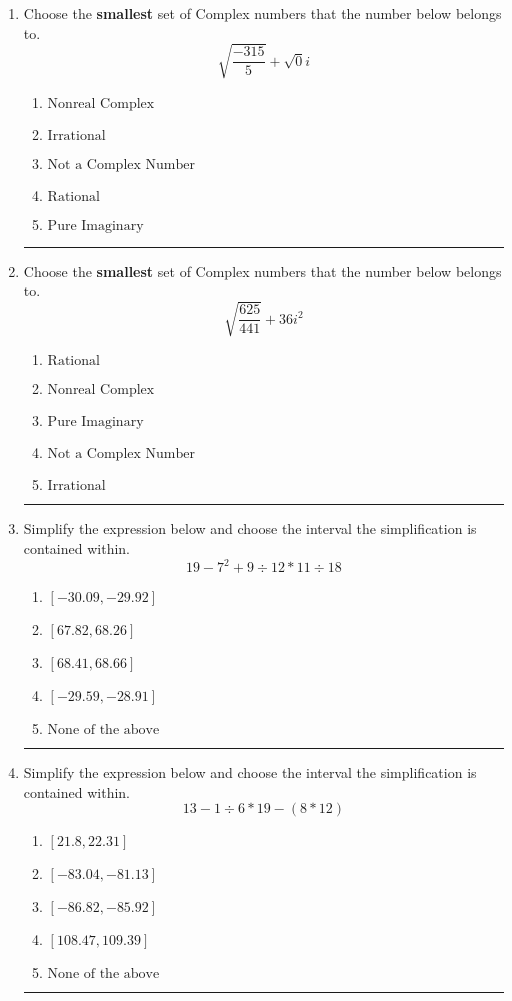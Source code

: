 \documentclass[14pt]{extbook}
\newcommand{\litem}[1]{\item#1\hspace*{-1cm}\rule{\textwidth}{0.4pt}}
\begin{document}
\begin{enumerate}
\litem{
Choose the \textbf{smallest} set of Complex numbers that the number below belongs to.\[ \sqrt{\frac{-315}{5}}+\sqrt{0}i \]\begin{enumerate}[label=\Alph*.]
\item \( \text{Nonreal Complex} \)
\item \( \text{Irrational} \)
\item \( \text{Not a Complex Number} \)
\item \( \text{Rational} \)
\item \( \text{Pure Imaginary} \)

\end{enumerate} }
\litem{
Choose the \textbf{smallest} set of Complex numbers that the number below belongs to.\[ \sqrt{\frac{625}{441}} + 36i^2 \]\begin{enumerate}[label=\Alph*.]
\item \( \text{Rational} \)
\item \( \text{Nonreal Complex} \)
\item \( \text{Pure Imaginary} \)
\item \( \text{Not a Complex Number} \)
\item \( \text{Irrational} \)

\end{enumerate} }
\litem{
Simplify the expression below and choose the interval the simplification is contained within.\[ 19 - 7^2 + 9 \div 12 * 11 \div 18 \]\begin{enumerate}[label=\Alph*.]
\item \( [-30.09, -29.92] \)
\item \( [67.82, 68.26] \)
\item \( [68.41, 68.66] \)
\item \( [-29.59, -28.91] \)
\item \( \text{None of the above} \)

\end{enumerate} }
\litem{
Simplify the expression below and choose the interval the simplification is contained within.\[ 13 - 1 \div 6 * 19 - (8 * 12) \]\begin{enumerate}[label=\Alph*.]
\item \( [21.8, 22.31] \)
\item \( [-83.04, -81.13] \)
\item \( [-86.82, -85.92] \)
\item \( [108.47, 109.39] \)
\item \( \text{None of the above} \)


\end{enumerate}}
\end{enumerate}
\end{document}
